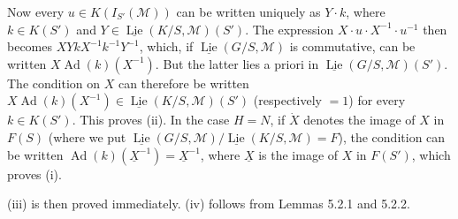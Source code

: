 Now every \(u\in K(I_{S'}(\mathscr M))\) can be written uniquely as
\(Y\cdot k\), where \(k\in K(S')\) and
\(Y\in\underline{\operatorname{Lie}}(K/S,\mathscr M)(S')\). The expression
\(X\cdot u\cdot X^{-1}\cdot u^{-1}\) then becomes
\(XYkX^{-1}k^{-1}Y^{-1}\), which, if
\(\underline{\operatorname{Lie}}(G/S,\mathscr M)\) is commutative, can be
written \(X\operatorname{Ad}(k)(X^{-1})\). But the latter lies a priori in
\(\underline{\operatorname{Lie}}(G/S,\mathscr M)(S')\). The condition on
\(X\) can therefore be written
\(X\operatorname{Ad}(k)(X^{-1})\in\underline{\operatorname{Lie}}(K/S,\mathscr M)(S')\)
(respectively \(=1\)) for every \(k\in K(S')\). This proves (ii). In the
case \(H=N\), if \(\dot X\) denotes the image of \(X\) in \(F(S)\) (where
we put
\(\underline{\operatorname{Lie}}(G/S,\mathscr M)/\underline{\operatorname{Lie}}(K/S,\mathscr M)=F\)),
the condition can be written \(\operatorname{Ad}(k)(\underline X^{-1})=\underline X^{-1}\),
where \(\underline X\) is the image of \(X\) in \(F(S')\), which proves (i).

(iii) is then proved immediately. (iv) follows from Lemmas 5.2.1 and
5.2.2.

